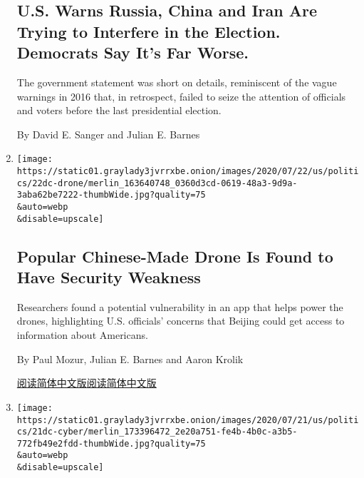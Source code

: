 \begin{enumerate}
  \hypertarget{us-warns-russia-china-and-iran-are-trying-to-interfere-in-the-election-democrats-say-its-far-worse}{%
  \subsection{U.S. Warns Russia, China and Iran Are Trying to Interfere
  in the Election. Democrats Say It's Far
  Worse.}\label{us-warns-russia-china-and-iran-are-trying-to-interfere-in-the-election-democrats-say-its-far-worse}}

  The government statement was short on details, reminiscent of the
  vague warnings in 2016 that, in retrospect, failed to seize the
  attention of officials and voters before the last presidential
  election.

  By David E. Sanger and Julian E. Barnes
\item
  \href{/2020/07/23/us/politics/dji-drones-security-vulnerability.html}{}

  \texttt{[image: https://static01.graylady3jvrrxbe.onion/images/2020/07/22/us/politics/22dc-drone/merlin\_163640748\_0360d3cd-0619-48a3-9d9a-3aba62be7222-thumbWide.jpg?quality=75\\\&auto=webp\\\&disable=upscale]}

  \hypertarget{popular-chinese-made-drone-is-found-to-have-security-weakness}{%
  \subsection{Popular Chinese-Made Drone Is Found to Have Security
  Weakness}\label{popular-chinese-made-drone-is-found-to-have-security-weakness}}

  Researchers found a potential vulnerability in an app that helps power
  the drones, highlighting U.S. officials' concerns that Beijing could
  get access to information about Americans.

  By Paul Mozur, Julian E. Barnes and Aaron Krolik

  \href{https://cn.nytimes3xbfgragh.onion/usa/20200724/dji-drones-security-vulnerability/}{阅读简体中文版}\href{https://cn.nytimes3xbfgragh.onion/usa/20200724/dji-drones-security-vulnerability/}{阅读简体中文版}
\item
  \href{/2020/07/21/us/politics/china-hacking-coronavirus-vaccine.html}{}

  \texttt{[image: https://static01.graylady3jvrrxbe.onion/images/2020/07/21/us/politics/21dc-cyber/merlin\_173396472\_2e20a751-fe4b-4b0c-a3b5-772fb49e2fdd-thumbWide.jpg?quality=75\\\&auto=webp\\\&disable=upscale]}


\end{enumerate}
